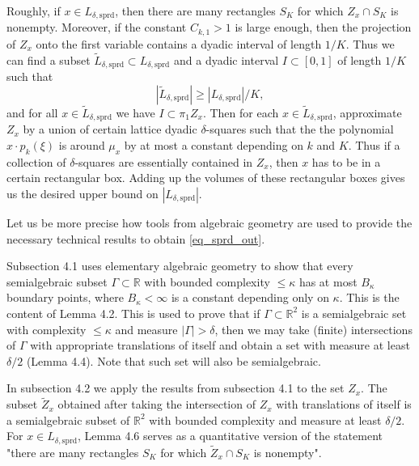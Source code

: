 \documentclass[12pt]{article}
\theoremstyle{definition}
\theoremstyle{remark}
\numberwithin{equation}{section}
\begin{document}
Roughly, if $x\in L_{\delta,\mathrm{sprd}}$, then there are many rectangles $S_K$ for which $Z_x\cap S_K$ is nonempty. Moreover, if the constant $C_{k,1} > 1$ is large enough, then the projection of $Z_x$ onto the first variable contains a dyadic interval of length $1/K$. Thus we can find a subset $\widetilde{L}_{\delta,\mathrm{sprd}}\subset L_{\delta,\mathrm{sprd}}$ and a dyadic interval $I\subset [0,1]$ of length $1/K$ such that
\begin{equation*}
|\widetilde{L}_{\delta,\mathrm{sprd}}|\geq |L_{\delta,\mathrm{sprd}}|/K,
\end{equation*}
and for all $x\in \widetilde{L}_{\delta,\mathrm{sprd}}$ we have $I\subset \pi_1 Z_x$. 
Then for each $x\in\widetilde{L}_{\delta,\mathrm{sprd}}$, approximate $Z_x$ by a union of certain lattice dyadic $\delta$-squares such that the the polynomial $x\cdot p_k(\xi)$ is around $\mu_x$ by at most a constant depending on $k$ and $K$. Thus if a collection of $\delta$-squares are essentially contained in $Z_x$, then $x$ has to be in a certain rectangular box. Adding up the volumes of these rectangular boxes gives us the desired upper bound on $|L_{\delta,\mathrm{sprd}}|$.

Let us be more precise how tools from algebraic geometry are used to provide the necessary technical results to obtain \eqref{eq_sprd_out}.

Subsection 4.1 uses elementary algebraic geometry to show that every semialgebraic subset $\Gamma\subset\mathbb{R}$ with bounded complexity $\leq\kappa$ has at most $B_\kappa$ boundary points, where $B_\kappa<\infty$ is a constant depending only on $\kappa$. This is the content of Lemma 4.2. This is used to prove that if $\Gamma\subset\mathbb{R}^2$ is a semialgebraic set with complexity $\leq\kappa$ and measure $|\Gamma|>\delta$, then we may take (finite) intersections of $\Gamma$ with appropriate translations of itself and obtain a set with measure at least $\delta/2$ (Lemma 4.4). Note that such set will also be semialgebraic.

In subsection 4.2 we apply the results from subsection 4.1 to the set $Z_x$. The subset $\widetilde{Z}_x$ obtained after taking the intersection of $Z_x$ with translations of itself is a semialgebraic subset of $\mathbb{R}^2$ with bounded complexity and measure at least $\delta/2$. For $x\in L_{\delta,\mathrm{sprd}}$, Lemma 4.6 serves as a quantitative version of the statement "there are many rectangles $S_K$ for which $\widetilde{Z}_x \cap S_K$ is nonempty". 
\end{document}
